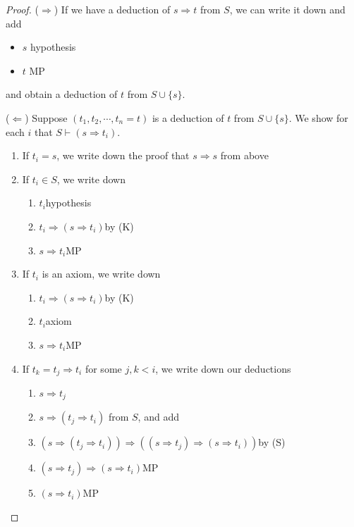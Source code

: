 \documentclass[a4paper]{article}
\theoremstyle{definition}
\begin{document}
\begin{proof}
  ($\Rightarrow$) If we have a deduction of $s\Rightarrow t$ from $S$, we can write it down and add
  \begin{itemize}
  \item $s$ \hfill hypothesis
  \item $t$ \hfill MP
  \end{itemize}
  and obtain a deduction of $t$ from $S\cup \{s\}$.

  ($\Leftarrow$) Suppose $(t_1, t_2, \cdots, t_n = t)$ is a deduction of $t$ from $S\cup \{s\}$. We show for each $i$ that $S\vdash (s\Rightarrow t_i)$.
  \begin{enumerate}
  \item If $t_i = s$, we write down the proof that $s\Rightarrow s$ from above
  \item If $t_i\in S$, we write down
    \begin{enumerate}
    \item $t_i$\hfill hypothesis
    \item $t_i\Rightarrow (s\Rightarrow t_i)$\hfill by (K)
    \item $s\Rightarrow t_i$\hfill MP
    \end{enumerate}
  \item If $t_i$ is an axiom, we write down
    \begin{enumerate}
    \item $t_i\Rightarrow (s\Rightarrow t_i)$\hfill by (K)
    \item $t_i$\hfill axiom
    \item $s\Rightarrow t_i$\hfill MP
    \end{enumerate}
  \item If $t_k = t_j\Rightarrow t_i$ for some $j, k < i$, we write down our deductions
    \begin{enumerate}
    \item $s\Rightarrow t_j$
    \item $s\Rightarrow (t_j \Rightarrow t_i)$ from $S$, and add
    \item $(s\Rightarrow (t_j\Rightarrow t_i))\Rightarrow ((s\Rightarrow t_j)\Rightarrow(s\Rightarrow t_i))$\hfill by (S)
    \item $(s\Rightarrow t_j)\Rightarrow (s\Rightarrow t_i)$\hfill MP
    \item $(s\Rightarrow t_i)$\hfill MP
    \end{enumerate}
  \end{enumerate}
\end{proof}
\end{document}
